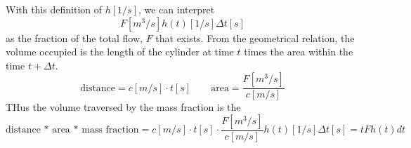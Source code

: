 \documentclass[12pt]{article}
\begin{document}
With this definition of $h[1/s]$, we can interpret
\[
 F [m^3/s] h(t) [1/s] \Delta t [s] 
\]
as the fraction of  the total flow, $F$ that exists. 
From the geometrical relation, the volume occupied is the length of the cylinder
at time $t$ times the area within the time $t+ \Delta t$.
\[
 \text{distance} =  c [m/s] \cdot t [s]
\qquad
 \text{area} =  \frac{F [m^3/s]}{c[m/s]} 
\]
THus the volume traversed by the mass fraction is the 
\[
 \text{distance * area * mass fraction} =  c [m/s] \cdot t [s]
 \cdot \frac{F [m^3/s]}{c[m/s]}   h(t) [1/s] \Delta t [s] 
  = t F h(t) dt
\]
\end{document}
